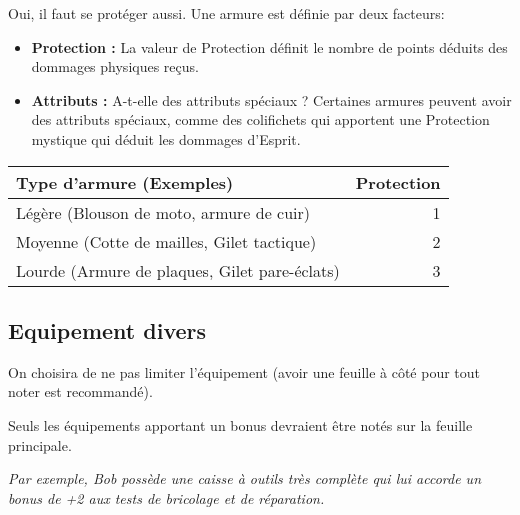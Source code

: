 Oui, il faut se protéger aussi. Une armure est définie par deux facteurs: 

\begin{itemize}
\item \textbf{Protection :} La valeur de Protection définit le nombre de points déduits des dommages physiques reçus.
\item \textbf{Attributs :} A-t-elle des attributs spéciaux ? Certaines armures peuvent avoir des attributs spéciaux, comme des colifichets qui apportent une Protection mystique qui déduit les dommages d'Esprit.
\end{itemize}

\begin{tabular}{lr}\\\toprule  
Type d'armure (Exemples) & Protection \\\midrule
Légère (Blouson de moto, armure de cuir) & 1 \\  
Moyenne (Cotte de mailles, Gilet tactique) & 2 \\ 
Lourde (Armure de plaques, Gilet pare-éclats) & 3 \\  \bottomrule
\end{tabular}

\subsection{Equipement divers}

On choisira de ne pas limiter l'équipement (avoir une feuille à côté pour tout noter est recommandé).

Seuls les équipements apportant un bonus devraient être notés sur la feuille principale.

\emph{Par exemple, Bob possède une caisse à outils très complète qui lui accorde un bonus de +2 aux tests de bricolage et de réparation.}